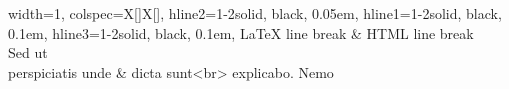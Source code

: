 \begin{table}
\centering
\begin{tblr}[         %
]                     %
{                     %
width={1\linewidth},
colspec={X[]X[]},
hline{2}={1-2}{solid, black, 0.05em},
hline{1}={1-2}{solid, black, 0.1em},
hline{3}={1-2}{solid, black, 0.1em},
}                     %
LaTeX line break & HTML line break \\
{Sed ut \\ perspiciatis unde} & dicta sunt<br> explicabo. Nemo \\
\end{tblr}
\end{table} 
